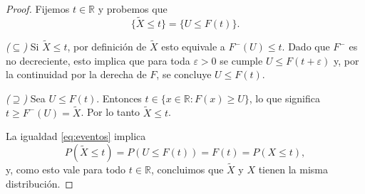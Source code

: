 \documentclass[../Main.tex]{subfiles}
\begin{document}
\begin{proof}
Fijemos $t\in\mathbb R$ y probemos que
\begin{equation}\label{eq:eventos}
    \{\tilde X\le t\}=\{U\le F(t)\}.
\end{equation}

\noindent\textit{($\subseteq$)\;}
Si $\tilde X\le t$, por definición de $\tilde X$ esto equivale a
$F^{-}(U)\le t$.  Dado que $F^{-}$ es no decreciente, esto implica que
para toda $\varepsilon>0$ se cumple $U\le F(t+\varepsilon)$ y,
por la continuidad por la derecha de $F$, se concluye $U\le F(t)$.

\medskip
\noindent\textit{($\supseteq$)\;}
Sea $U\le F(t)$.
Entonces $t\in\{x\in\mathbb R : F(x)\ge U\}$, lo que significa
$t\ge F^{-}(U)=\tilde X$.
Por lo tanto $\tilde X\le t$.

\medskip
La igualdad \eqref{eq:eventos} implica
\[
    P(\tilde X\le t)=P(U\le F(t))=F(t)=P(X\le t),
\]
y, como esto vale para todo $t\in\mathbb R$, concluimos que
$\tilde X$ y $X$ tienen la misma distribución.
\end{proof}


\end{document}
